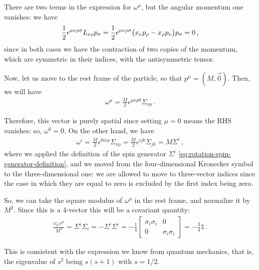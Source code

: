 \documentclass[main.tex]{subfiles}
\begin{document}
There are two terms in the expression for \(\omega^{\mu }\), but the angular momentum one vanishes: we have 
%
\begin{align}
\frac{1}{2} \epsilon^{\mu \nu \rho \sigma }L_{\nu \rho } p_{\sigma }
= 
\frac{1}{2} \epsilon^{\mu \nu \rho \sigma } \qty(x_{\nu }p_{\rho } - x_{\rho } p_{\nu }) p_{\sigma } =0
\,,
\end{align}
%
since in both cases we have the contraction of two copies of the momentum, which are symmetric in their indices, with the antisymmetric tensor. 

Now, let us move to the rest frame of the particle, so that \(p^{\mu } = (M, \vec{0})\).
Then, we will have 
%
\begin{align}
\omega^{\mu } = \frac{M}{2} \epsilon^{\mu \nu \rho 0} \Sigma_{\nu \rho }
\,.
\end{align}

Therefore, this vector is purely spatial since setting \(\mu =0\) means the RHS vanishes: so, \(\omega^{0} = 0\). On the other hand, we have 
%
\begin{align}
\omega^{i} = \frac{M}{2} \epsilon^{0i \nu \rho } \Sigma_{\nu \rho } = \frac{M}{2} \epsilon^{i j k } \Sigma_{j k } = M \Sigma^{i}
\,,
\end{align}
%
where we applied the definition of the spin generator \(\Sigma^{i}\) \eqref{eq:rotation-spin-generator-definition}, and we moved from the four-dimensional Kronecker symbol to the three-dimensional one: we are allowed to move to three-vector indices since the case in which they are equal to zero is excluded by the first index being zero.

So, we can take the square modulus of \(\omega^{\mu }\) in the rest frame, and normalize it by \(M^2\). Since this is a 4-vector this will be a covariant quantity: 
%
\begin{align}
\frac{\omega_{\mu } \omega^{\mu }}{M^2}
= \Sigma^{i} \Sigma_{i} = - \Sigma^{i} \Sigma^{i} = -\frac{1}{4} \left[\begin{array}{cc}
\sigma_{i} \sigma_{i} & 0 \\ 
0 & \sigma_{i } \sigma_{i}
\end{array}\right]
= - \frac{3}{4} \mathbb{1}
\,.
\end{align}

This is consistent with the expression we know from quantum mechanics, that is, the eigenvalue of \(s^2\) being \(s (s+1)\) with \(s = 1/2\).

\end{document}
